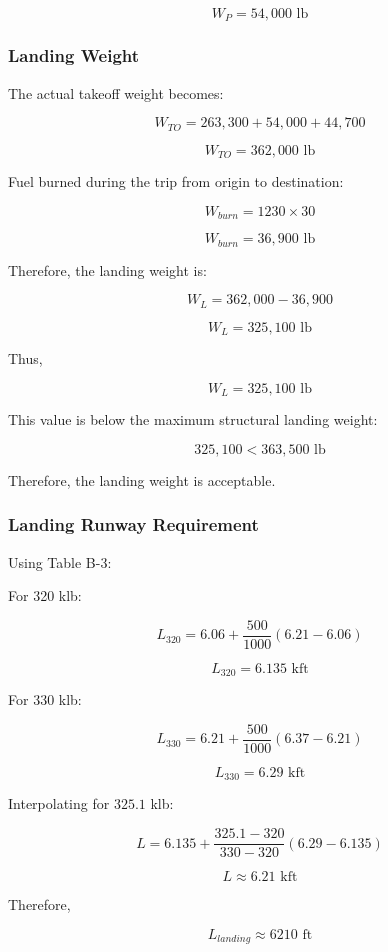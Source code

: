 \documentclass{KPS_assignment}
\begin{document}
\[
\boxed{
W_P=54,000 \text{ lb}
}
\]

\subsubsection*{Landing Weight}

The actual takeoff weight becomes:

\[
W_{TO}
=
263,300+54,000+44,700
\]

\[
W_{TO}=362,000 \text{ lb}
\]

Fuel burned during the trip from origin to destination:

\[
W_{burn}=1230\times30
\]

\[
W_{burn}=36,900 \text{ lb}
\]

Therefore, the landing weight is:

\[
W_L
=
362,000-36,900
\]

\[
W_L=325,100 \text{ lb}
\]

Thus,

\[
\boxed{
W_L=325,100 \text{ lb}
}
\]

This value is below the maximum structural landing weight:

\[
325,100 < 363,500 \text{ lb}
\]

Therefore, the landing weight is acceptable.

\subsubsection*{Landing Runway Requirement}

Using Table B-3:

For 320 klb:

\[
L_{320}
=
6.06
+
\frac{500}{1000}(6.21-6.06)
\]

\[
L_{320}=6.135 \text{ kft}
\]

For 330 klb:

\[
L_{330}
=
6.21
+
\frac{500}{1000}(6.37-6.21)
\]

\[
L_{330}=6.29 \text{ kft}
\]

Interpolating for $325.1$ klb:

\[
L
=
6.135
+
\frac{325.1-320}{330-320}(6.29-6.135)
\]

\[
L\approx6.21 \text{ kft}
\]

Therefore,

\[
\boxed{
L_{landing}\approx6210 \text{ ft}
}
\]
\end{document}
